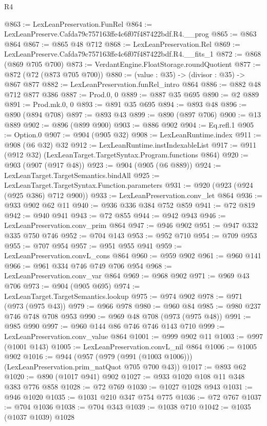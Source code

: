 \begin{lexlean}{R4}
\begin{coremodule}
@863 := LexLeanPreservation.FunRel
@864 := LexLeanPreserve.Cafda79c757163ffe4c6f07f487422bdf.R4.__prog
@865 := @863 @864
@867 := @865 @48 @712
@868 := LexLeanPreservation.Rel
@869 := LexLeanPreserve.Cafda79c757163ffe4c6f07f487422bdf.R4.__fits_1
@872 := @868 (@869 @705 @700)
@873 := VerdantEngine.FloatStorage.roundQuotient
@877 := @872 (@72 (@873 @705 @700))
@880 := (value : @35) -> (divisor : @35) -> @867 @877
@882 := LexLeanPreservation.funRel_intro @864
@886 := @882 @48 @712 @877 @386
@887 := Prod.{0, 0}
@889 := @887 @35 @695
@890 := @2 @889
@891 := Prod.mk.{0, 0}
@893 := @891 @35 @695
@894 := @893 @48
@896 := @890 (@894 @708)
@897 := @893 @43
@899 := @890 (@897 @706)
@900 := @13 @889
@902 := @896 (@899 @900)
@903 := @886 @902
@904 := Eq.refl.{1}
@905 := Option.{0}
@907 := @904 (@905 @32)
@908 := LexLeanRuntime.index
@911 := @908 (@6 @32) @32
@912 := LexLeanRuntime.instIndexableList
@917 := @911 (@912 @32) (LexLeanTarget.TargetSyntax.Program.functions @864)
@920 := @903 (@907 (@917 @48))
@923 := @904 (@905 (@6 @889))
@924 := LexLeanTarget.TargetSemantics.bindAll
@925 := LexLeanTarget.TargetSyntax.Function.parameters
@931 := @920 (@923 (@924 (@925 @386) @712 @900))
@933 := LexLeanPreservation.conv_let @864
@936 := @933 @902 @62 @11
@940 := @936 @336 @384 @752 @859
@941 := @72 @819
@942 := @940 @941
@943 := @72 @855
@944 := @942 @943
@946 := LexLeanPreservation.conv_prim @864
@947 := @946 @902
@951 := @947 @332 @335 @750 @746
@952 := @704 @143
@953 := @952 @710
@954 := @709 @953
@955 := @707 @954
@957 := @951 @955 @941
@959 := LexLeanPreservation.convL_cons @864
@960 := @959 @902
@961 := @960 @141
@966 := @961 @334 @746 @749 @706 @954
@968 := LexLeanPreservation.conv_var @864
@969 := @968 @902
@971 := @969 @43 @706
@973 := @904 (@905 @695)
@974 := LexLeanTarget.TargetSemantics.lookup
@975 := @974 @902
@978 := @971 (@973 (@975 @43))
@979 := @966 @978
@980 := @960 @84
@985 := @980 @237 @746 @748 @708 @953
@990 := @969 @48 @708 (@973 (@975 @48))
@991 := @985 @990
@997 := @960 @144 @86 @746 @746 @143 @710
@999 := LexLeanPreservation.conv_value @864
@1001 := @999 @902 @11
@1003 := @997 (@1001 @143)
@1005 := LexLeanPreservation.convL_nil @864
@1006 := @1005 @902
@1016 := @944 (@957 (@979 (@991 (@1003 @1006))) (LexLeanPreservation.prim_natQuot @705 @700 @43))
@1017 := @893 @62
@1020 := @890 (@1017 @941) @902
@1027 := @933 @1020 @108 @11 @348 @383 @776 @858
@1028 := @72 @769
@1030 := @1027 @1028 @943
@1031 := @946 @1020
@1035 := @1031 @210 @347 @754 @775
@1036 := @72 @767
@1037 := @704 @1036
@1038 := @704 @343
@1039 := @1038 @710
@1042 := @1035 (@1037 @1039) @1028

\end{coremodule}
\end{lexlean}
